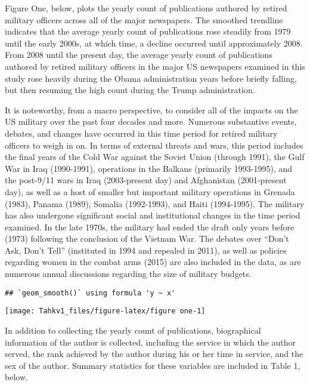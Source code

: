 \documentclass[12pt,]{article}
\begin{document}
Figure One, below, plots the yearly count of publications authored by retired military officers across all of the major newspapers. The smoothed trendline indicates that the average yearly count of publications rose steadily from 1979 until the early 2000s, at which time, a decline occurred until approximately 2008. From 2008 until the present day, the average yearly count of publications authored by retired military officers in the major US newspapers examined in this study rose heavily during the Obama administration years before briefly falling, but then resuming the high count during the Trump administration.

It is noteworthy, from a macro perspective, to consider all of the impacts on the US military over the past four decades and more. Numerous substantive events, debates, and changes have occurred in this time period for retired military officers to weigh in on. In terms of external threats and wars, this period includes the final years of the Cold War against the Soviet Union (through 1991), the Gulf War in Iraq (1990-1991), operations in the Balkans (primarily 1993-1995), and the post-9/11 wars in Iraq (2003-present day) and Afghanistan (2001-present day), as well as a host of smaller but important military operations in Grenada (1983), Panama (1989), Somalia (1992-1993), and Haiti (1994-1995). The military has also undergone significant social and institutional changes in the time period examined. In the late 1970s, the military had ended the draft only years before (1973) following the conclusion of the Vietnam War. The debates over ``Don't Ask, Don't Tell'' (instituted in 1994 and repealed in 2011), as well as policies regarding women in the combat arms (2015) are also included in the data, as are numerous annual discussions regarding the size of military budgets.

\begin{verbatim}
## `geom_smooth()` using formula 'y ~ x'
\end{verbatim}

\begin{center}\texttt{[image: Tahkv1\_files/figure-latex/figure one-1]} \end{center}

In addition to collecting the yearly count of publications, biographical information of the author is collected, including the service in which the author served, the rank achieved by the author during his or her time in service, and the sex of the author. Summary statistics for these variables are included in Table 1, below.
\end{document}
